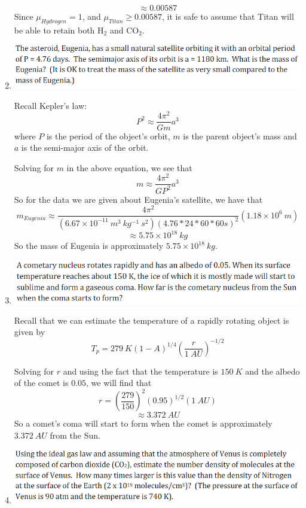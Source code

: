 \documentclass{article}
\begin{document}
\begin{enumerate}
    \[\approx 0.00587\]
    Since $\mu_{Hydrogen} = 1$, and $\mu_{Titan} \geq 0.00587$, it is safe to assume that Titan will be able to retain both H$_2$ and CO$_2$.
    
    \item \includegraphics[scale = 0.85]{probset5prob4.PNG}
    
    Recall Kepler's law:
    \begin{equation}
        P^2 \approx \frac{4\pi^2}{Gm}a^3
    \end{equation}
    where $P$ is the period of the object's orbit, $m$ is the parent object's mass and $a$ is the semi-major axis of the orbit.
    
    Solving for $m$ in the above equation, we see that 
    \begin{equation}
        m \approx \frac{4 \pi^2}{GP^2}a^3
    \end{equation}
    So for the data we are given about Eugenia's satellite, we have that
    \[m_{Eugenia} \approx \frac{4\pi^2}{(6.67 \times 10^{-11} \:m^3 \:kg^{-1} \:s^{2})(4.76 * 24 *  60 * 60 s)^2}(1.18 \times 10^6 \:m)\]
    \[\approx 5.75 \times 10^{18} \:kg\]
    So the mass of Eugenia is approximately $5.75 \times 10^{18} \:kg$.
    
    \item \includegraphics[scale = 0.85]{probset5prob5.PNG}
    
    Recall that we can estimate the temperature of a rapidly rotating object is given by
    \begin{equation}
         T_p = 279 \:K(1-A)^{1/4}(\frac{r}{1 \:AU})^{-1/2}   
    \end{equation}
    
    Solving for $r$ and using the fact that the temperature is $150 \:K$ and the albedo of the comet is $0.05$, we will find that 
    \[r = (\frac{279}{150})^2 (0.95)^{1/2}(1 \:AU)\]
    \[\approx 3.372 \:AU\]
    So a comet's coma will start to form when the comet is approximately $3.372 \:AU$  from the Sun.
    \item \includegraphics[scale = 0.85]{probset5prob6.PNG}
    

\end{enumerate}
\end{document}
